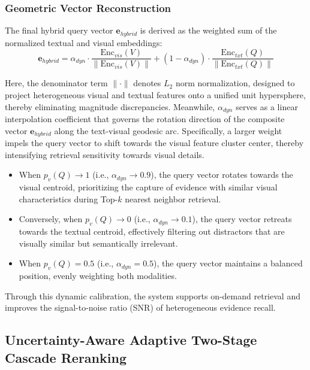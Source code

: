 \documentclass[a4paper, fleqn]{cas-dc}
\begin{document}
\subsubsection{Geometric Vector Reconstruction}\label{sec:geometric_vector_reconstruction}

The final hybrid query vector $\mathbf{e}_{hybrid}$ is derived as the weighted sum of the normalized textual and visual embeddings:
\begin{equation}
\mathbf{e}_{hybrid} = \alpha_{dyn} \cdot \frac{\text{Enc}_{vis}(V)}{\|\text{Enc}_{vis}(V)\|} + (1 - \alpha_{dyn}) \cdot \frac{\text{Enc}_{txt}(Q)}{\|\text{Enc}_{txt}(Q)\|}
\label{eq:hybrid_query}
\end{equation}

Here, the denominator term $\|\cdot\|$ denotes $L_2$ norm normalization, designed to project heterogeneous visual and textual features onto a unified unit hypersphere, thereby eliminating magnitude discrepancies. Meanwhile, $\alpha_{dyn}$ serves as a linear interpolation coefficient that governs the rotation direction of the composite vector $\mathbf{e}_{hybrid}$ along the text-visual geodesic arc.
Specifically, a larger weight impels the query vector to shift towards the visual feature cluster center, thereby intensifying retrieval sensitivity towards visual details.

\begin{itemize}
    \item When $p_v(Q) \to 1$ (i.e., $\alpha_{dyn} \to 0.9$), the query vector rotates towards the visual centroid, prioritizing the capture of evidence with similar visual characteristics during Top-$k$ nearest neighbor retrieval.
    \item Conversely, when $p_v(Q) \to 0$ (i.e., $\alpha_{dyn} \to 0.1$), the query vector retreats towards the textual centroid, effectively filtering out distractors that are visually similar but semantically irrelevant.
    \item When $p_v(Q) = 0.5$ (i.e., $\alpha_{dyn} = 0.5$), the query vector maintains a balanced position, evenly weighting both modalities.
\end{itemize}

Through this dynamic calibration, the system supports on-demand retrieval and improves the signal-to-noise ratio (SNR) of heterogeneous evidence recall.
\subsection{Uncertainty-Aware Adaptive Two-Stage Cascade Reranking}\label{sec:reranking}
\end{document}
